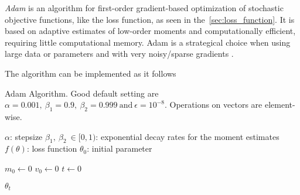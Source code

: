 \emph{Adam} is an algorithm for first-order gradient-based optimization of stochastic objective functions, like the loss function, as seen in the~\cref{sec:loss_function}.
It is based on adaptive estimates of low-order moments and computationally efficient, requiring little computational memory.
Adam is a strategical choice when using large data or parameters and with very noisy/sparse gradients \citep{kingma2017}.

The algorithm can be implemented as it follows

\begin{algorithm}
\caption[Adam Algorithm]{Adam Algorithm. Good default setting are \(\alpha = 0.001,\ \beta_1 = 0.9,\ \beta_2 = 0.999\ \text{and}\ \epsilon = 10^{-8}\). Operations on vectors are element-wise.}
\begin{algorithmic}
\Require \(\alpha\): stepsize
\Require \(\beta_1,\ \beta_2\ \in [0,1)\): exponential decay rates for the moment estimates
\Require \(f(\theta)\): loss function
\Require \(\theta_0\): initial parameter

\State \(m_0 \gets 0\)
\State \(v_0 \gets 0\)
\State \(t \gets 0\)
\EndWhile

\Return \(\theta_t\)
\end{algorithmic}
\end{algorithm}



